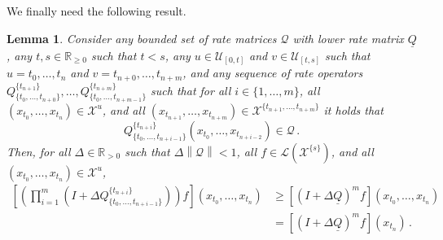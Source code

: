 \documentclass[a4paper,reqno]{amsart}
\newtheorem{lemma}[theorem]{Lemma}
\newcommand{\reals}{\mathbb{R}}
\newcommand{\realspos}{\reals_{>0}}
\newcommand{\realsnonneg}{\reals_{\geq 0}}
\newcommand{\states}{\mathcal{X}}
\newcommand{\gambles}{\mathcal{L}}
\newcommand{\lrate}{\underline{Q}}
\newcommand{\norm}[1]{\left\lVert #1 \right\rVert}
\begin{document}
We finally need the following result.
\begin{lemma}\label{lemma:nonmarkov_rateproduct_bounded_by_lrate}
Consider any bounded set of rate matrices $\mathcal{Q}$ with lower rate matrix $\lrate$, any $t,s\in\realsnonneg$ such that $t<s$, any $u\in\mathcal{U}_{[0,t]}$ and $v\in\mathcal{U}_{[t,s]}$ such that $u=t_0,\ldots,t_n$ and $v=t_{n+0},\ldots,t_{n+m}$, and any sequence of rate operators $Q_{\{t_0,\ldots,t_{n+0}\}}^{\{t_{n+1}\}},\ldots,Q_{\{t_0,\ldots,t_{n+m-1}\}}^{\{t_{n+m}\}}$ such that for all $i\in\{1,\ldots,m\}$, all $(x_{t_0},\ldots,x_{t_n})\in\states^u$, and all $(x_{t_{n+1}},\ldots,x_{t_{n+m}})\in\states^{\{t_{n+1},\ldots,t_{n+m}\}}$ it holds that 
\begin{equation*}
Q_{\{t_0,\ldots,t_{n+i-1}\}}^{\{t_{n+i}\}}(x_{t_0},\ldots,x_{t_{n+i-2}})\in\mathcal{Q}\,.
\end{equation*}
Then, for all $\Delta\in\realspos$ such that $\Delta\norm{\mathcal{Q}}<1$, all $f\in\gambles(\states^{\{s\}})$, and all $(x_{t_0},\ldots,x_{t_n})\in\states^u$,
\begin{align*}
\left[\left(\prod_{i=1}^m \left(I + \Delta Q_{\{t_0,\ldots,t_{n+i-1}\}}^{\{t_{n+i}\}} \right)\right)f\right](x_{t_0},\ldots,x_{t_n}) &\geq \left[\left(I + \Delta \lrate\right)^m f\right](x_{t_0},\ldots,x_{t_n})\\
 &= \left[\left(I + \Delta \lrate\right)^m f\right](x_{t_n})\,.
\end{align*}
\end{lemma}
\end{document}
